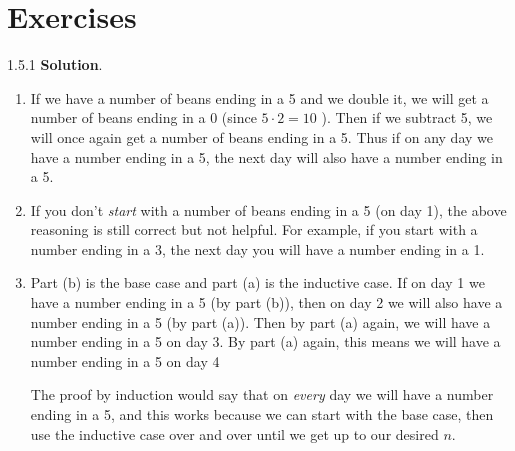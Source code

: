 \documentclass[11pt,]{book}
\theoremstyle{ptxplainnotitle}
\theoremstyle{ptxplaintitle}
\theoremstyle{ptxdefinitionnotitle}
\theoremstyle{ptxdefinitiontitle}
\theoremstyle{ptxdefinitionnotitle}
\theoremstyle{ptxdefinitiontitle}
\theoremstyle{ptxdefinitionnotitle}
\theoremstyle{ptxdefinitiontitle}
\theoremstyle{ptxdefinitiontitlenonumber}
\theoremstyle{ptxdefinitiontitlenonumber}
\numberwithin{equation}{chapter}
\begin{document}
\section*{Exercises}
\begin{divisionexercise}{1.5.1}
\textbf{Solution}.\quad%
\hypertarget{p-583}{}%
\leavevmode%
\begin{enumerate}[label=(\alph*)]
\item\hypertarget{li-247}{}\hypertarget{p-584}{}%
If we have a number of beans ending in a 5 and we double it, we will get a number of beans ending in a 0 (since \(5\cdot 2 = 10\) ).  Then if we subtract 5, we will once again get a number of beans ending in a 5.  Thus if on any day we have a number ending in a 5, the next day will also have a number ending in a 5.%
\item\hypertarget{li-248}{}\hypertarget{p-585}{}%
If you don't \emph{start} with a number of beans ending in a 5 (on day 1), the above reasoning is still correct but not helpful.  For example, if you start with a number ending in a 3, the next day you will have a number ending in a 1.%
\item\hypertarget{li-249}{}\hypertarget{p-586}{}%
Part (b) is the base case and part (a) is the inductive case.  If on day 1 we have a number ending in a 5 (by part (b)), then on day 2 we will also have a number ending in a 5 (by part (a)).  Then by part (a) again, we will have a number ending in a 5 on day 3.  By part (a) again, this means we will have a number ending in a 5 on day 4%
\par
\hypertarget{p-587}{}%
The proof by induction would say that on \emph{every} day we will have a number ending in a 5, and this works because we can start with the base case, then use the inductive case over and over until we get up to our desired \(n\).%
\end{enumerate}
%
\end{divisionexercise}%
\end{document}
